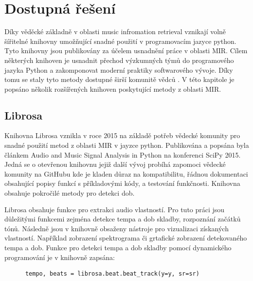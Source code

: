 \cite{Music_classification_using_deep_learning}

\cite{Music_genre_classification_paper}



\section{Dostupná řešení} \label{sec:Dostupna_reseni}
    Díky věděcké základně v oblasti music infromation retrieval vznikají volně šířitelné knihovny umožňující snadné použití v programovacím jazyce python. Tyto knihovny jsou publikovány za účelem usnadnění práce v oblasti \acs{MIR}. Cílem některých knihoven je usnadnit přechod výzkumných týmů do programového jazyka Python a zakomponovat moderní praktiky softwarového vývoje. Díky tomu se staly tyto metody dostupné širší komunitě vědců \cite{Librosa}. V této kapitole je popsáno několik rozšířených knihoven poskytující metody z oblasti \acs{MIR}.

\subsection{Librosa} \label{sec:Librosa}
    Knihovna Librosa vznikla v roce 2015 na základě potřeb vědecké komunity pro snadné použití metod z oblasti \acs{MIR} v jayzce python.
    Publikována a popsána byla článkem Audio and Music Signal Analysis in Python \cite{Librosa} na konferenci SciPy 2015.
    Jedná se o otevřenou knihovnu jejiž další vývoj probíhá zapomoci vědecké komunity na GitHubu kde je kladen důraz na kompatibilitu, řádnou dokumentaci obsahující popisy funkcí s příkladovými kódy, a testování funkčnosti. Knihovna obsahuje pokročilé metody pro detekci dob.

    Librosa obsahuje funkce pro extrakci audio vlastností.
    Pro tuto práci jsou důležitými funkcemi zejména detekce tempa a dob skladby, rozpoznání začátků tónů. Následně jsou v knihovně obsaženy nástroje pro vizualizaci získaných vlastností. Například zobrazení spektrograma či grtafické zobrazení detekovaného tempa a dob.
    Funkce pro detekci tempa a dob skladby pomocí dynamického programování je v knihovně zapsána:

    \begin{lstlisting}
      tempo, beats = librosa.beat.beat_track(y=y, sr=sr)
    \end{lstlisting}
    
